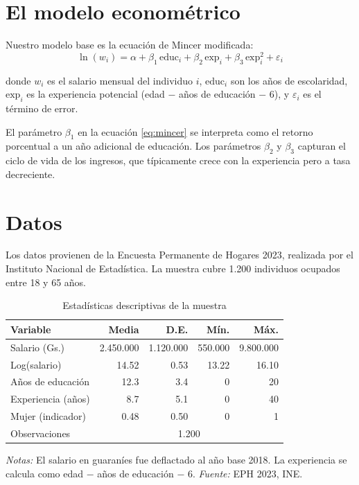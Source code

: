 \documentclass[12pt, a4paper]{article}
\begin{document}
\section{El modelo econométrico}

Nuestro modelo base es la ecuación de Mincer modificada:
\begin{equation}
  \ln(w_i) = \alpha + \beta_1 \, \text{educ}_i + \beta_2 \, \text{exp}_i 
             + \beta_3 \, \text{exp}_i^2 + \varepsilon_i
  \label{eq:mincer}
\end{equation}

donde $w_i$ es el salario mensual del individuo $i$, $\text{educ}_i$ son los 
años de escolaridad, $\text{exp}_i$ es la experiencia potencial (edad $-$ años 
de educación $-$ 6), y $\varepsilon_i$ es el término de error.

El parámetro $\beta_1$ en la ecuación \eqref{eq:mincer} se interpreta como el 
retorno porcentual a un año adicional de educación. Los parámetros $\beta_2$ 
y $\beta_3$ capturan el ciclo de vida de los ingresos, que típicamente crece 
con la experiencia pero a tasa decreciente.

\section{Datos}

Los datos provienen de la Encuesta Permanente de Hogares 2023, realizada por 
el Instituto Nacional de Estadística. La muestra cubre 1.200 individuos 
ocupados entre 18 y 65 años.

\begin{table}[htbp]
  \centering
  \caption{Estadísticas descriptivas de la muestra}
  \label{tab:desc}
  \begin{tabular}{lrrrr}
    \toprule
    Variable                & Media  & D.E.   & Mín. & Máx. \\
    \midrule
    Salario (Gs.)           & 2.450.000 & 1.120.000 & 550.000 & 9.800.000 \\
    Log(salario)            & 14.52  & 0.53   & 13.22 & 16.10 \\
    Años de educación       & 12.3   & 3.4    & 0    & 20   \\
    Experiencia (años)      & 8.7    & 5.1    & 0    & 40   \\
    Mujer (indicador)       & 0.48   & 0.50   & 0    & 1    \\
    \midrule
    Observaciones           & \multicolumn{4}{c}{1.200} \\
    \bottomrule
  \end{tabular}
  \begin{minipage}{\linewidth}
    \footnotesize \textit{Notas:} El salario en guaraníes fue deflactado 
    al año base 2018. La experiencia se calcula como edad $-$ años de 
    educación $-$ 6. \textit{Fuente:} EPH 2023, INE.
  \end{minipage}
\end{table}
\end{document}
